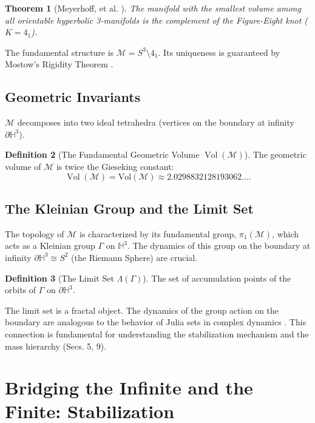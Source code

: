 \documentclass[11pt, a4paper]{article}
\newtheorem{theorem}{Theorem}[section]
\theoremstyle{definition}
\newtheorem{definition}[theorem]{Definition}
\theoremstyle{definition}
\newcommand{\HH}{\mathbb{H}^3}
\newcommand{\M}{\mathcal{M}}
\newcommand{\Vol}{\operatorname{Vol}}
\newcommand{\Veight}{\Vol(\M)}
\newcommand{\LimitSet}{\Lambda} %
\newcommand{\KleinianGroup}{\Gamma} %
\newcommand{\Vval}{2.0298832128193062...}
\begin{document}
\begin{theorem}[Meyerhoff, et al. \cite{Meyerhoff1987}]\label{thm:meyerhoff}
The manifold with the smallest volume among all orientable hyperbolic 3-manifolds is the complement of the Figure-Eight knot ($K=4_1$).
\end{theorem}

The fundamental structure is $\M = S^3 \setminus 4_1$. Its uniqueness is guaranteed by Mostow's Rigidity Theorem \cite{Mostow1973}.

\subsection{Geometric Invariants}

$\M$ decomposes into two ideal tetrahedra (vertices on the boundary at infinity $\partial \HH$).

\begin{definition}[The Fundamental Geometric Volume $\Veight$]
The geometric volume of $\M$ is twice the Gieseking constant:
\begin{equation}
    \Veight = \text{Vol}(\M) \approx \Vval.
\end{equation}
\end{definition}

\subsection{The Kleinian Group and the Limit Set}

The topology of $\M$ is characterized by its fundamental group, $\pi_1(\M)$, which acts as a Kleinian group $\KleinianGroup$ on $\HH$. The dynamics of this group on the boundary at infinity $\partial \HH \cong S^2$ (the Riemann Sphere) are crucial.

\begin{definition}[The Limit Set $\LimitSet(\KleinianGroup)$]
The set of accumulation points of the orbits of $\KleinianGroup$ on $\partial \HH$.
\end{definition}

The limit set is a fractal object. The dynamics of the group action on the boundary are analogous to the behavior of Julia sets in complex dynamics \cite{McMullen1994}. This connection is fundamental for understanding the stabilization mechanism and the mass hierarchy (Secs. 5, 9).

\section{Bridging the Infinite and the Finite: Stabilization}
\end{document}
